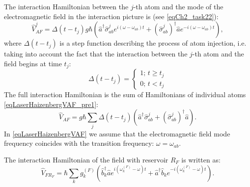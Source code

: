 The interaction Hamiltonian between the $j$-th atom and the mode
of the electromagnetic field in the interaction picture is (see \ref{eqCh2_task22}):
\begin{equation}
\hat{V}_{AF}^j =
\Delta\left(t - t_j\right) 
g \hbar \left(
\hat{a}^{\dag}\hat{\sigma}^{j}_{ab} e^{i \left(\omega -
  \omega_{ab}\right)t} +
\left(\hat{\sigma}^{j}_{ab}\right)^{\dag} 
\hat{a} e^{-i \left(\omega - \omega_{ab}\right)t}
\right),
\label{eqLaserHaizenbergVAF_pre1}
\end{equation}
where $\Delta\left(t - t_j\right)$ is a step function describing
the process of atom injection, i.e. taking into account the fact that
the interaction between the $j$-th atom and the field begins at time $t_j$:
\begin{equation}
\Delta\left(t - t_j\right) =
\left\{
\begin{array}{c}
1;\, t \ge t_j \\
0;\, t < t_j 
\end{array}
\right.
\nonumber
\end{equation}
The full interaction Hamiltonian is the sum of Hamiltonians
of individual atoms
\eqref{eqLaserHaizenbergVAF_pre1}:
\begin{equation}
\hat{V}_{AF} =
g \hbar
\sum_j
\Delta\left(t - t_j\right) 
 \left(
\hat{a}^{\dag}\hat{\sigma}^{j}_{ab}  +
\left(\hat{\sigma}^{j}_{ab}\right)^{\dag} 
\hat{a}
\right).
\label{eqLaserHaizenbergVAF}
\end{equation}
In \eqref{eqLaserHaizenbergVAF} we assume that the electromagnetic field mode frequency
coincides with the transition frequency: $\omega =
\omega_{ab}$.

The interaction Hamiltonian of the field with reservoir $R_F$ is written as:
\begin{equation}
\hat{V}_{FR_F} =
\hbar
\sum_k
g_k^{(F)}
 \left(
\hat{b}_k^{\dag}\hat{a} e^{i\left(\omega_k^{(F)} - \omega\right)t} +
\hat{a}^{\dag}\hat{b}_k e^{-i\left(\omega_k^{(F)} - \omega\right)t}
\right).
\label{eqLaserHaizenbergVFRF}
\end{equation}

